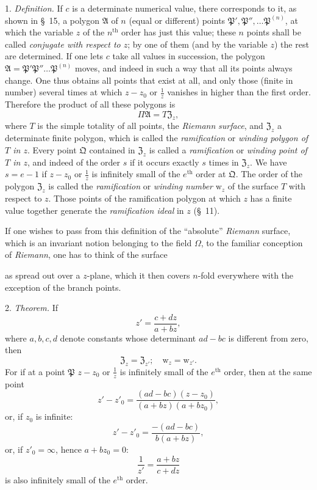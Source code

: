 \documentclass{article}
\begin{document}
1. \emph{Definition.} If $c$ is a determinate numerical value, there corresponds to it, as shown in §~15, a polygon $\mathfrak{A}$ of $n$ (equal or different) points $\mathfrak{P}', \mathfrak{P}'', \ldots \mathfrak{P}^{(n)}$, at which the variable $z$ of the $n^{\text{th}}$ order has just this value; these $n$ points shall be called \emph{conjugate with respect to $z$}; by one of them (and by the variable $z$) the rest are determined. If one lets $c$ take all values in succession, the polygon $\mathfrak{A} = \mathfrak{P}'\mathfrak{P}''\ldots\mathfrak{P}^{(n)}$ moves, and indeed in such a way that all its points always change. One thus obtains all points that exist at all, and only those (finite in number) several times at which $z - z_{0}$ or $\frac{1}{z}$ vanishes in higher than the first order. Therefore the product of all these polygons is
\[ \Pi\mathfrak{A} = T\mathfrak{Z}_{z}, \]
where $T$ is the simple totality of all points, the \emph{Riemann} \emph{surface}, and $\mathfrak{Z}_{z}$ a determinate finite polygon, which is called the \emph{ramification} or \emph{winding polygon of $T$ in $z$}. Every point $\mathfrak{Q}$ contained in $\mathfrak{Z}_{z}$ is called a \emph{ramification} or \emph{winding point of $T$ in $z$}, and indeed of the order $s$ if it occurs exactly $s$ times in $\mathfrak{Z}_{z}$. We have $s = e-1$ if $z - z_{0}$ or $\frac{1}{z}$ is infinitely small of the $e^{\text{th}}$ order at $\mathfrak{Q}$. The order of the polygon $\mathfrak{Z}_{z}$ is called the \emph{ramification} or \emph{winding number} $\mathrm{w}_{z}$ of the surface $T$ with respect to $z$. Those points of the ramification polygon at which $z$ has a finite value together generate the \emph{ramification ideal} in $z$ (§~11).

If one wishes to pass from this definition of the ``absolute'' \emph{Riemann} surface, which is an invariant notion belonging to the field $\Omega$, to the familiar conception of \emph{Riemann}, one has to think of the surface

as spread out over a $z$-plane, which it then covers $n$-fold everywhere with the exception of the branch points.

2. \emph{Theorem.} If
\[ z' = \frac{c+dz}{a+bz}, \]
where $a, b, c, d$ denote constants whose determinant $ad-bc$ is different from zero, then
\[ \mathfrak{Z}_{z} = \mathfrak{Z}_{z'}; \quad \mathrm{w}_{z} = \mathrm{w}_{z'}. \]
For if at a point $\mathfrak{P}$ $z - z_{0}$ or $\frac{1}{z}$ is infinitely small of the $e^{\text{th}}$ order, then at the same point
\[ z' - z'_{0} = \frac{(ad-bc)(z-z_{0})}{(a+bz)(a+bz_{0})}, \]
or, if $z_{0}$ is infinite:
\[ z' - z'_{0} = \frac{-(ad-bc)}{b(a+bz)}, \]
or, if $z'_{0} = \infty$, hence $a+bz_{0} = 0$:
\[ \frac{1}{z'} = \frac{a+bz}{c+dz} \]
is also infinitely small of the $e^{\text{th}}$ order.
\end{document}
